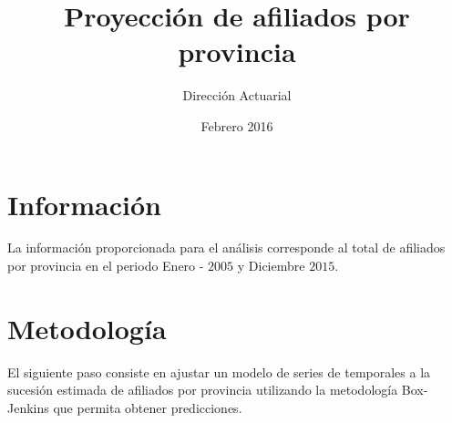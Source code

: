 \documentclass[11pt,a4paper,oneside]{article}\usepackage[]{graphicx}\usepackage[]{color}
\title{Proyección de afiliados por provincia}
\author{Dirección Actuarial}
\date{Febrero 2016}
\begin{document}
\maketitle


\section{Información}

La información proporcionada para el análisis corresponde al total de afiliados por provincia en el periodo Enero - $2005$ y Diciembre $2015$.

\section{Metodología}

El siguiente paso consiste en ajustar un modelo de series de temporales a la sucesión estimada de afiliados por provincia utilizando la metodología Box-Jenkins que permita obtener predicciones.\newline 
\end{document}
